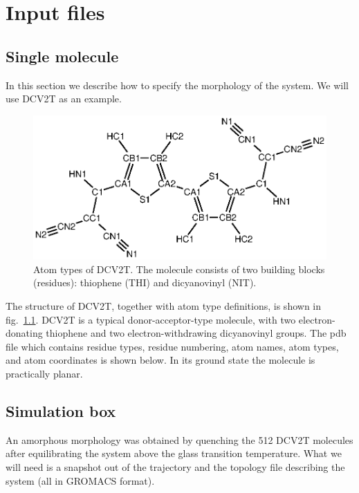 \chapter{Input files}
\label{sec:mapping}

\newcommand{\ctpmap}{\hyperref[prog:ctp_map]{\texttt{ctp\_map}}\xspace}
\newcommand{\dumptraj}{\hyperref[calc:dumptraj]{\texttt{dumptraj}}\xspace}

\section{Single molecule}
In this section we describe how to specify the morphology of the system. We will use DCV2T as an example.

\begin{figure}
\centering
\includegraphics[width=0.9\linewidth]{./fig/chemical_structure/dcv2t_atom_types}
\caption{\small Atom types of DCV2T. The molecule consists of two building blocks (residues): thiophene (THI) and dicyanovinyl (NIT). }
\label{fig:dcv2t_at}
\end{figure}

The structure of DCV2T, together with atom type definitions, is shown in fig.~\ref{fig:dcv2t_at}. DCV2T is a typical donor-acceptor-type molecule, with two electron-donating thiophene and two electron-withdrawing dicyanovinyl groups. The pdb file which contains residue types, residue numbering, atom names, atom types, and atom coordinates is shown below. In its ground state the molecule is practically planar. 

\section{Simulation box}
An amorphous morphology was obtained by quenching the 512 DCV2T molecules after equilibrating the system above the glass transition temperature. What we will need is a snapshot out of the trajectory and the topology file describing the system (all in GROMACS format).

